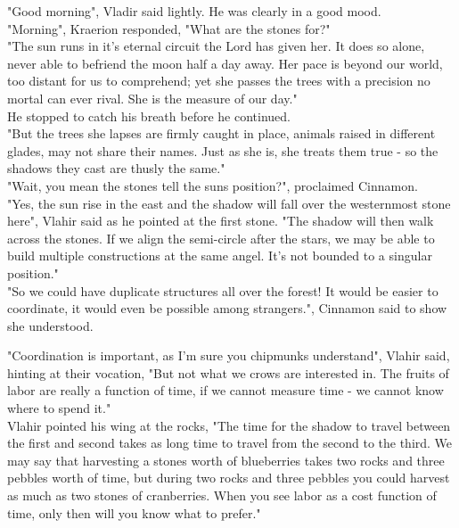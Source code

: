 \documentclass[smalldemyvopaper,11pt,twoside,onecolumn,openright,extrafontsizes]{memoir}
\begin{document}
"Good morning", Vladir said lightly. He was clearly in a good mood. \\

"Morning", Kraerion responded, "What are the stones for?"\\

"The sun runs in it's eternal circuit the Lord has given her. It does so alone, never able to befriend the moon half a day away. Her pace is beyond our world, too distant for us to comprehend; yet she passes the trees with a precision no mortal can ever rival. She is the measure of our day."\\

He stopped to catch his breath before he continued.\\

"But the trees she lapses are firmly caught in place, animals raised in different glades, may not share their names. Just as she is, she treats them true - so the shadows they cast are thusly the same."\\

"Wait, you mean the stones tell the suns position?", proclaimed Cinnamon.\\

"Yes, the sun rise in the east and the shadow will fall over the westernmost stone here", Vlahir said as he pointed at the first stone. "The shadow will then walk across the stones. If we align the semi-circle after the stars, we may be able to build multiple constructions at the same angel. It's not bounded to a singular position."\\

"So we could have duplicate structures all over the forest! It would be easier to coordinate, it would even be possible among strangers.", Cinnamon said to show she understood. 

"Coordination is important, as I'm sure you chipmunks understand", Vlahir said, hinting at their vocation, "But not what we crows are interested in. The fruits of labor are really a function of time, if we cannot measure time - we cannot know where to spend it." \\ 

Vlahir pointed his wing at the rocks, "The time for the shadow to travel between the first and second takes as long time to travel from the second to the third. We may say that harvesting a stones worth of blueberries takes two rocks and three pebbles worth of time, but during two rocks and three pebbles you could harvest as much as two stones of cranberries. When you see labor as a cost function of time, only then will you know what to prefer."
\end{document}
